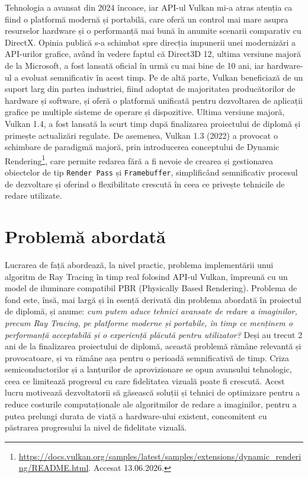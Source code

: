 \documentclass[12pt,a4paper]{report}
\numberwithin{equation}{section} %
\begin{document}
Tehnologia a avansat din 2024 încoace, iar API-ul Vulkan mi-a atras atenția ca fiind o platformă modernă și portabilă, care oferă un control mai mare asupra resurselor hardware și o performanță mai bună în anumite scenarii comparativ cu DirectX.
Opinia publică s-a schimbat spre direcția impunerii unei modernizări a API-urilor grafice, având în vedere faptul că Direct3D 12, ultima versiune majoră de la Microsoft, a fost lansată oficial în urmă cu mai bine de 10 ani, iar hardware-ul a evoluat semnificativ în acest timp.
Pe de altă parte, Vulkan beneficiază de un suport larg din partea industriei, fiind adoptat de majoritatea producătorilor de hardware și software, și oferă o platformă unificată pentru dezvoltarea de aplicații grafice pe multiple sisteme de operare și dispozitive.
Ultima versiune majoră, Vulkan 1.4, a fost lansată la scurt timp după finalizarea proiectului de diplomă și primește actualizări regulate.
De asemenea, Vulkan 1.3 (2022) a provocat o schimbare de paradigmă majoră, prin introducerea conceptului de Dynamic Rendering\footnote{\url{https://docs.vulkan.org/samples/latest/samples/extensions/dynamic_rendering/README.html}. Accesat 13.06.2026.}, care permite redarea fără a fi nevoie de crearea și gestionarea obiectelor de tip \texttt{Render Pass} și \texttt{Framebuffer}, simplificând semnificativ procesul de dezvoltare și oferind o flexibilitate crescută în ceea ce privește tehnicile de redare utilizate.

\section{Problemă abordată}

Lucrarea de față abordează, la nivel practic, problema implementării unui algoritm de Ray Tracing în timp real folosind API-ul Vulkan, împreună cu un model de iluminare compatibil PBR (Physically Based Rendering).
Problema de fond este, însă, mai largă și în esență derivată din problema abordată în proiectul de diplomă, și anume: \textit{cum putem aduce tehnici avansate de redare a imaginilor, precum Ray Tracing, pe platforme moderne și portabile, în timp ce menținem o performanță acceptabilă și o experiență plăcută pentru utilizator?}
Deși au trecut 2 ani de la finalizarea proiectului de diplomă, această problemă rămâne relevantă și provocatoare, și va rămâne așa pentru o perioadă semnificativă de timp.
Criza semiconductorilor și a lanțurilor de aprovizionare se opun avansului tehnologic, ceea ce limitează progresul cu care fidelitatea vizuală poate fi crescută.
Acest lucru motivează dezvoltatorii să găsească soluții și tehnici de optimizare pentru a reduce costurile computaționale ale algoritmilor de redare a imaginilor, pentru a putea prelungi durata de viață a hardware-ului existent, concomitent cu păstrarea progresului la nivel de fidelitate vizuală.
\end{document}
